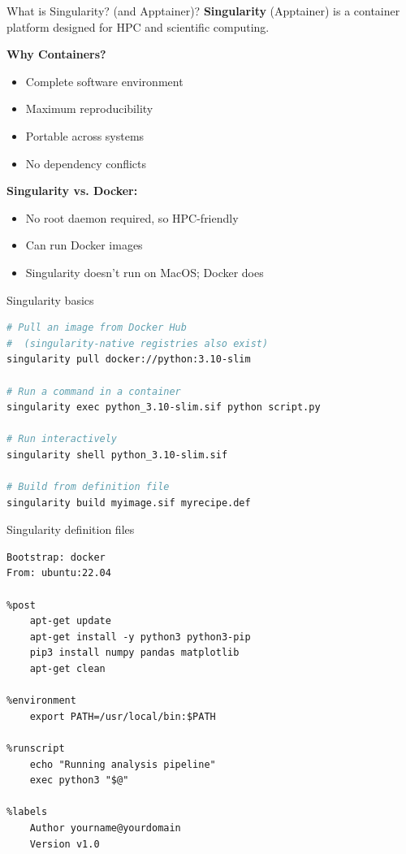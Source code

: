 \documentclass[aspectratio=169]{beamer}
\begin{document}

\begin{frame}{What is Singularity? (and Apptainer)?}
    \textbf{Singularity} (Apptainer) is a container platform designed for HPC and scientific computing.
    
    \vspace{0.5cm}
    \textbf{Why Containers?}
    \begin{itemize}
        \item Complete software environment
        \item Maximum reproducibility
        \item Portable across systems
        \item No dependency conflicts
    \end{itemize}
    
    \vspace{0.3cm}
    \textbf{Singularity vs. Docker:}
    \begin{itemize}
        \item No root daemon required, so HPC-friendly
        \item Can run Docker images
          \item Singularity doesn't run on MacOS; Docker does
    \end{itemize}
\end{frame}

\begin{frame}[fragile]{Singularity basics}
  \begin{lstlisting}[language=bash]
# Pull an image from Docker Hub
#  (singularity-native registries also exist)
singularity pull docker://python:3.10-slim

# Run a command in a container
singularity exec python_3.10-slim.sif python script.py

# Run interactively
singularity shell python_3.10-slim.sif

# Build from definition file
singularity build myimage.sif myrecipe.def
\end{lstlisting}
\end{frame}

\begin{frame}[fragile]{Singularity definition files}
    \begin{lstlisting}
Bootstrap: docker
From: ubuntu:22.04

%post
    apt-get update
    apt-get install -y python3 python3-pip
    pip3 install numpy pandas matplotlib
    apt-get clean

%environment
    export PATH=/usr/local/bin:$PATH

%runscript
    echo "Running analysis pipeline"
    exec python3 "$@"

%labels
    Author yourname@yourdomain
    Version v1.0
\end{lstlisting}
\end{frame}
\end{document}
